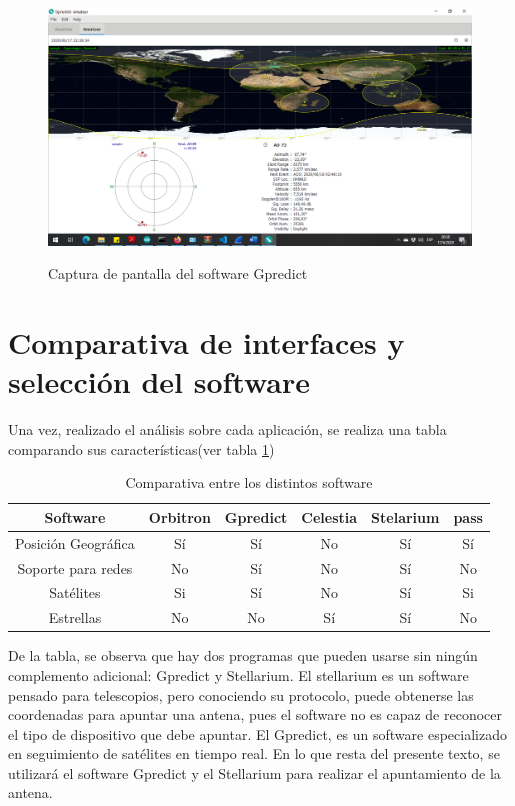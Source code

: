 \begin{figure}[h]
	\centering
	\includegraphics[width=\linewidth,height=7cm]{gpredict}
	\caption{Captura de pantalla del software Gpredict}
	\label{fig:iu_gpredict}
\end{figure}


\section{Comparativa de interfaces y selección del software}
Una vez, realizado el análisis sobre cada aplicación, se realiza una tabla comparando sus características(ver tabla \ref{tab:comp_soft})
\begin{table}[htb]
	\centering
	\begin{tabular}{|c|c|c|c|c|c|}
		\hline
		Software 			& Orbitron & Gpredict & Celestia & Stelarium & pass\\ 
		\hline
		Posición Geográfica & Sí 	   & Sí 	  & No 		 & Sí        & Sí  \\
		\hline
		Soporte para redes  & No 	   & Sí       & No       & Sí        & No  \\
		\hline
		Satélites 			& Si 	   & Sí		  & No		 & Sí	 & Si  \\
		\hline
		Estrellas 			& No	   & No		  &Sí		 & Sí		 & No  \\
		\hline	
\end{tabular}
\caption{Comparativa entre los distintos software} 
\label{tab:comp_soft}
\end{table}

De la tabla, se observa que hay dos programas que pueden usarse sin ningún complemento adicional: Gpredict y Stellarium. El stellarium es un software pensado para telescopios, pero conociendo su protocolo, puede obtenerse las coordenadas para apuntar una antena, pues el software no es capaz de reconocer el tipo de dispositivo que debe apuntar. El Gpredict, es un software especializado en seguimiento de satélites en tiempo real. En lo que resta del presente texto, se utilizará el software Gpredict y el Stellarium para realizar el apuntamiento de la antena. 
 


